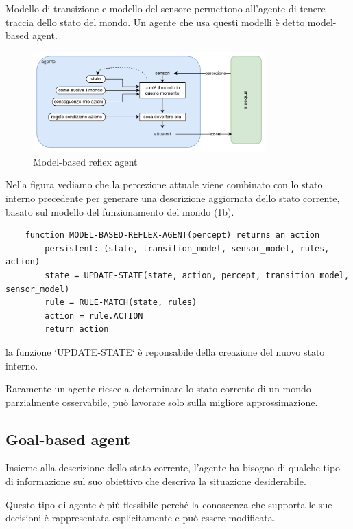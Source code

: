 Modello di transizione e modello del sensore permettono all’agente di tenere traccia dello stato del mondo. Un agente che usa questi modelli è detto model-based agent.

\begin{figure}[H]
	\centering
	\includegraphics[width=0.8\textwidth]{capitoli/agenti-intelligenti/imgs/model-based.png}
	\caption{Model-based reflex agent}
	\label{fig:immagine3}
\end{figure}

Nella figura vediamo che la percezione attuale viene combinato con lo stato interno precedente per generare una descrizione aggiornata dello stato corrente, basato sul modello del funzionamento del mondo (1b).

\begin{lstlisting}
	function MODEL-BASED-REFLEX-AGENT(percept) returns an action
		persistent: (state, transition_model, sensor_model, rules, action)
		state = UPDATE-STATE(state, action, percept, transition_model, sensor_model)
		rule = RULE-MATCH(state, rules)
		action = rule.ACTION
		return action
\end{lstlisting}

la funzione `UPDATE-STATE` è reponsabile della creazione del nuovo stato interno.

Raramente un agente riesce a determinare lo stato corrente di un mondo parzialmente osservabile, può lavorare solo sulla migliore approssimazione.

\subsection{Goal-based agent}

Insieme alla descrizione dello stato corrente, l’agente ha bisogno di qualche tipo di informazione sul suo obiettivo che descriva la situazione desiderabile.

Questo tipo di agente è più flessibile perché la conoscenza che supporta le sue decisioni è rappresentata esplicitamente e può essere modificata.

